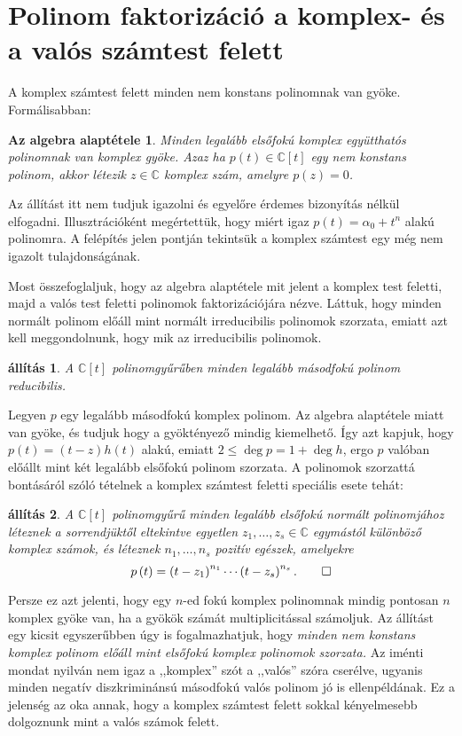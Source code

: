 \documentclass[a4paper, showtrims]{memoir}
\makeatletter
\renewenvironment{proof}[1][\proofname]
    {\par\pushQED{\qed}%
    \normalfont \topsep6\p@\@plus6\p@\relax
    \trivlist
    \item[\hskip\labelsep
        \itshape
    #1\@addpunct{:}]\ignorespaces}
    {\popQED\endtrivlist\@endpefalse}
\theoremstyle{plain}
\newtheorem{proposition}{állítás}[chapter]
\newtheorem*{FA}{Az algebra alaptétele}
\theoremstyle{remark}
\theoremstyle{definition}
\makeatother
\begin{document}
\section{Polinom faktorizáció a komplex- és a valós számtest felett}
A komplex számtest felett minden nem konstans polinomnak van gyöke.
Formálisabban:
\begin{FA}
	Minden legalább elsőfokú komplex együtthatós polinomnak van komplex gyöke.
	Azaz
	ha $p\left( t \right)\in\mathbb{C}[t]$ egy nem konstans polinom,
	akkor létezik $z\in\mathbb{C}$ komplex szám,
	amelyre $p\left( z \right)=0$.
\end{FA}
Az állítást itt nem tudjuk igazolni és egyelőre érdemes bizonyítás nélkül elfogadni.
Illusztrációként megértettük, hogy miért igaz $p\left( t \right)=\alpha_0+t^n$ alakú polinomra.
A felépítés jelen pontján tekintsük a komplex számtest egy még nem igazolt tulajdonságának.

Most összefoglaljuk, hogy az algebra alaptétele mit jelent a komplex test feletti, majd a valós test feletti polinomok
faktorizációjára nézve.
Láttuk, hogy minden normált polinom előáll mint normált irreducibilis polinomok szorzata,
emiatt azt kell meggondolnunk, hogy mik az irreducibilis polinomok.
\begin{proposition}
	A $\mathbb{C}\left[ t \right]$ polinomgyűrűben minden legalább másodfokú polinom reducibilis.
\end{proposition}
\begin{proof}
	Legyen $p$ egy legalább másodfokú komplex polinom.
	Az algebra alaptétele miatt van gyöke, és
	tudjuk hogy a gyöktényező mindig kiemelhető.
	Így azt kapjuk, hogy $p(t)=\left( t-z \right)h\left( t \right)$ alakú,
	emiatt $2\leq\deg p=1+\deg h$, ergo
	$p$ valóban előállt mint két legalább elsőfokú polinom szorzata.
\end{proof}
A polinomok szorzattá bontásáról szóló tételnek a komplex számtest feletti speciális esete tehát:
\begin{proposition}\label{pr:PolFact}
	A $\mathbb{C}[t]$ polinomgyűrű minden legalább elsőfokú normált polinomjához léteznek
	a sorrendjüktől eltekintve egyetlen $z_1,\ldots,z_s\in\mathbb{C}$ egymástól különböző komplex számok,
	és léteznek $n_1,\ldots,n_s$ pozitív egészek,
	amelyekre
	\[
		p\left( t \right)=
		\left( t-z_1 \right)^{n_1}
		\cdots
		\left( t-z_s\right)^{n_s}.\qedhere
	\]
\end{proposition}
Persze ez azt jelenti, hogy egy $n$-ed fokú komplex polinomnak mindig pontosan $n$ komplex gyöke van,
ha a gyökök számát multiplicitással számoljuk.
Az állítást egy kicsit egyszerűbben úgy is fogalmazhatjuk,
hogy
\emph{
	minden nem konstans komplex polinom előáll mint elsőfokú komplex polinomok szorzata.
}
Az iménti mondat nyilván nem igaz a ,,komplex'' szót a ,,valós'' szóra cserélve,
ugyanis minden negatív diszkriminánsú másodfokú valós polinom jó is ellenpéldának.
Ez a jelenség az oka annak,
hogy a komplex számtest felett sokkal kényelmesebb dolgoznunk mint a valós számok felett.
\end{document}
